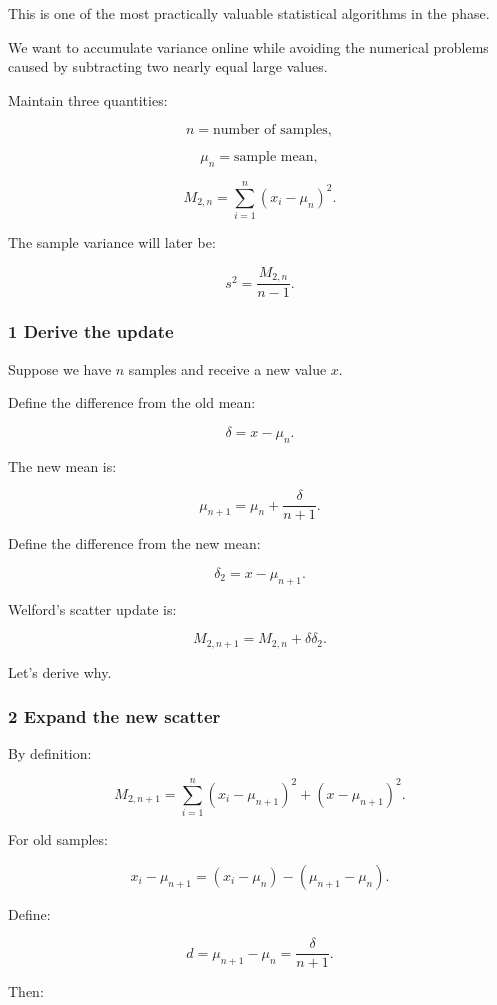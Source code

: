 This is one of the most practically valuable statistical algorithms in the phase.

We want to accumulate variance online while avoiding the numerical problems caused by subtracting two nearly equal large values.

Maintain three quantities:

\[
 n=\text{number of samples},
\]

\[
 \mu_n=\text{sample mean},
\]

\[
 M_{2,n}= \sum_{i=1}^{n}(x_i-\mu_n)^2.
\]

The sample variance will later be:

\[
 s^2=\frac{M_{2,n}}{n-1}.
\]

\subsubsection{1 Derive the update}\label{02-foundations-ii-ch030-derive-the-update}

Suppose we have \(n\) samples and receive a new value \(x\).

Define the difference from the old mean:

\[
 \boxed{\delta=x-\mu_n}.
\]

The new mean is:

\[
 \boxed{ \mu_{n+1} = \mu_n+\frac{\delta}{n+1} }.
\]

Define the difference from the new mean:

\[
 \boxed{ \delta_2=x-\mu_{n+1} }.
\]

Welford's scatter update is:

\[
 \boxed{ M_{2,n+1} = M_{2,n}+\delta\delta_2 }.
\]

Let's derive why.

\subsubsection{2 Expand the new scatter}\label{02-foundations-ii-ch030-expand-the-new-scatter}

By definition:

\[
 M_{2,n+1} = \sum_{i=1}^{n}(x_i-\mu_{n+1})^2 + (x-\mu_{n+1})^2.
\]

For old samples:

\[
 x_i-\mu_{n+1} = (x_i-\mu_n)-(\mu_{n+1}-\mu_n).
\]

Define:

\[
 d=\mu_{n+1}-\mu_n=\frac{\delta}{n+1}.
\]

Then:

